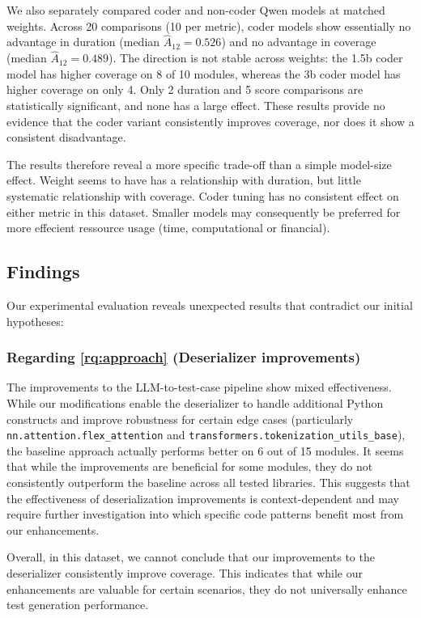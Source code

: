 \documentclass{article}
\begin{document}
We also separately compared coder and non-coder Qwen models at matched weights. Across 20 comparisons (10 per metric), coder models show essentially no advantage in duration (median $\hat{A}_{12}=0.526$) and no advantage in coverage (median $\hat{A}_{12}=0.489$). The direction is not stable across weights: the 1.5b coder model has higher coverage on 8 of 10 modules, whereas the 3b coder model has higher coverage on only 4. Only 2 duration and 5 score comparisons are statistically significant, and none has a large effect. These results provide no evidence that the coder variant consistently improves coverage, nor does it show a consistent disadvantage.

The results therefore reveal a more specific trade-off than a simple model-size effect. Weight seems to have has a relationship with duration, but little systematic relationship with coverage. Coder tuning has no consistent effect on either metric in this dataset. Smaller models may consequently be preferred for more effecient ressource usage (time, computational or financial).

\subsection{Findings}

Our experimental evaluation reveals unexpected results that contradict our initial hypotheses:

\subsubsection*{Regarding \ref{rq:approach} (Deserializer improvements)}
The improvements to the LLM-to-test-case pipeline show mixed effectiveness. While our modifications enable the deserializer to handle additional Python constructs and improve robustness for certain edge cases (particularly \texttt{nn.\allowbreak attention.\allowbreak flex\allowbreak \_attention} and \texttt{transformers.\allowbreak tokenization\allowbreak \_utils\allowbreak \_base}), the baseline approach actually performs better on 6 out of 15 modules. It seems that while the improvements are beneficial for some modules, they do not consistently outperform the baseline across all tested libraries. This suggests that the effectiveness of deserialization improvements is context-dependent and may require further investigation into which specific code patterns benefit most from our enhancements.

Overall, in this dataset, we cannot conclude that our improvements to the deserializer consistently improve coverage. This indicates that while our enhancements are valuable for certain scenarios, they do not universally enhance test generation performance.
\end{document}
